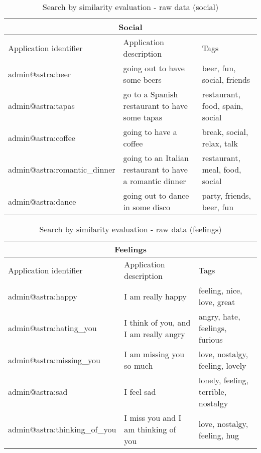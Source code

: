 \begin{table}[h!]
	\tiny
    \begin{center}
		\begin{tabular}{||l|l|l||}

		\hline \hline
		\multicolumn{3}{||c||}{\bfseries{Social}} \\
		\hline \hline
			Application identifier & Application description & Tags \\
			\hline \hline
			admin@astra:beer & going out to have some beers & beer, fun, social,
			friends\\
			\hline
			admin@astra:tapas & go to a Spanish restaurant to have some tapas
			& restaurant, food, spain, social\\
			\hline
			admin@astra:coffee & going to have a coffee & break, social, relax, talk\\
			\hline
			admin@astra:romantic\_dinner & going to an Italian restaurant to have a
			romantic dinner & restaurant, meal, food, social\\
			\hline
			admin@astra:dance & going out to dance in some disco & party, friends, beer,
			fun\\
		\hline \hline

		\end{tabular}
		\caption{\label{table:testing-data-social}Search by similarity evaluation -
		raw data (social)}
	\end{center}
\end{table} 

\begin{table}[h!]
	\tiny
    \begin{center}
		\begin{tabular}{||l|l|l||}

		\hline \hline
		\multicolumn{3}{||c||}{\bfseries{Feelings}} \\
		\hline \hline
			Application identifier & Application description & Tags \\
			\hline \hline
			admin@astra:happy & I am really happy & feeling, nice, love, great\\
			\hline
			admin@astra:hating\_you & I think of you, and I am really angry & angry,
			hate, feelings, furious\\
			\hline
			admin@astra:missing\_you & I am missing you so much & love, nostalgy,
			feeling, lovely\\
			\hline
			admin@astra:sad	& I feel sad & lonely, feeling, terrible, nostalgy\\
			\hline
			admin@astra:thinking\_of\_you &	I miss you and I am thinking of you & love,
			nostalgy, feeling, hug\\
		\hline \hline

		\end{tabular}
		\caption{\label{table:testing-data-feelings}Search by similarity evaluation -
		raw data (feelings)}
	\end{center}
\end{table} 


